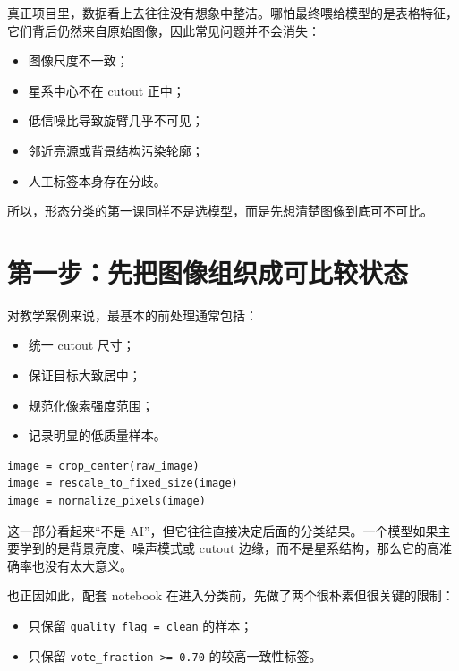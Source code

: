 真正项目里，数据看上去往往没有想象中整洁。哪怕最终喂给模型的是表格特征，它们背后仍然来自原始图像，因此常见问题并不会消失：

\begin{itemize}
    \item 图像尺度不一致；
    \item 星系中心不在 cutout 正中；
    \item 低信噪比导致旋臂几乎不可见；
    \item 邻近亮源或背景结构污染轮廓；
    \item 人工标签本身存在分歧。
\end{itemize}

所以，形态分类的第一课同样不是选模型，而是先想清楚图像到底可不可比。

\section{第一步：先把图像组织成可比较状态}

对教学案例来说，最基本的前处理通常包括：

\begin{itemize}
    \item 统一 cutout 尺寸；
    \item 保证目标大致居中；
    \item 规范化像素强度范围；
    \item 记录明显的低质量样本。
\end{itemize}

\begin{examplebox}[一个最小图像预处理思路]
\begin{lstlisting}[style=pythonstyle]
image = crop_center(raw_image)
image = rescale_to_fixed_size(image)
image = normalize_pixels(image)
\end{lstlisting}
\end{examplebox}

这一部分看起来“不是 AI”，但它往往直接决定后面的分类结果。一个模型如果主要学到的是背景亮度、噪声模式或 cutout 边缘，而不是星系结构，那么它的高准确率也没有太大意义。

也正因如此，配套 notebook 在进入分类前，先做了两个很朴素但很关键的限制：

\begin{itemize}
    \item 只保留 \texttt{quality\_flag = clean} 的样本；
    \item 只保留 \texttt{vote\_fraction >= 0.70} 的较高一致性标签。
\end{itemize}

